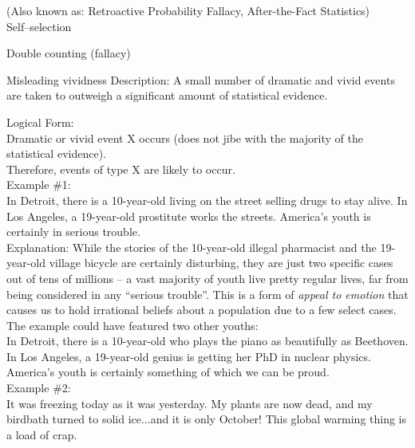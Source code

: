 \documentclass[a4paper,12pt,single,pdftex]{scrbook}
\begin{document}
  
    
      (Also known as: Retroactive Probability Fallacy, After-the-Fact Statistics)
    \\

  

Self–selection

Double counting (fallacy)

Misleading vividness
    Description: A small number of dramatic and vivid events are taken to outweigh a significant amount of statistical evidence.

    
      Logical Form:
    \\

    
      Dramatic or vivid event X occurs (does not jibe with the majority of the statistical evidence).
    \\

    
      Therefore, events of type X are likely to occur.
    \\

    
      Example \#1:
    \\

    
      In Detroit, there is a 10-year-old living on the street selling drugs to stay alive.  In Los Angeles, a 19-year-old prostitute works the streets.  America’s youth is certainly in serious trouble.
    \\

    
      Explanation: While the stories of the 10-year-old illegal pharmacist and the 19-year-old village bicycle are certainly disturbing, they are just two specific cases out of tens of millions -- a vast majority of youth live pretty regular lives, far from being considered in any “serious trouble”.  This is a form of {\it appeal to emotion} that causes us to hold irrational beliefs about a population due to a few select cases.  The example could have featured two other youths:
    \\

    
      In Detroit, there is a 10-year-old who plays the piano as beautifully as Beethoven.  In Los Angeles, a 19-year-old genius is getting her PhD in nuclear physics.  America’s youth is certainly something of which we can be proud.
    \\

    
      Example \#2:
    \\

    
      It was freezing today as it was yesterday.  My plants are now dead, and my birdbath turned to solid ice...and it is only October!  This global warming thing is a load of crap.
    \\
\end{document}
